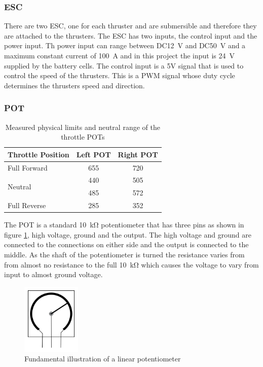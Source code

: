 		\subsubsection{ESC}
		There are two ESC, one for each thruster and are submersible and therefore they are attached to the thrusters. The ESC has two inputs, the control input and the power input. Th power input can range between DC\SI{12}{\volt} and DC\SI{50}{\volt} and a maximum constant current of \SI{100}{\ampere} and in this project the input is \SI{24}{\volt} supplied by the battery cells. The control input is a 5V signal that is used to control the speed of the thrusters. This is a PWM signal whose duty cycle determines the thrusters speed and direction. 
		\subsubsection{POT}
			\begin{table}[ht]
			\begin{center}
				\caption{Measured physical limits and neutral range of the throttle POTs}
				\label{tab:3:POT}
				\begin{tabular}{|l|c|c|}
					\hline		
					\textbf{Throttle Position} & \textbf{Left POT} & \textbf{Right POT} \\
					\hline
					Full Forward & 655 & 720\\
					\hline
					\multirow{2}{*}{Neutral} &440 &505 \\
					&485 &572  \\
					\hline
					Full Reverse & 285 & 352 \\
					\hline
				\end{tabular}
			\end{center}
		\end{table}
		The POT is a standard \SI{10}{\kilo\ohm} potentiometer that has three pins as shown in figure \ref{fig:3:POTdraw}, high voltage, ground and the output. The high voltage and ground are connected to the connections on either side and the output is connected to the middle. As the shaft of the potentiometer is turned the resistance varies from from almost no resistance to the full \SI{10}{\kilo\ohm} which causes the voltage to vary from input to almost ground voltage.  \par
		\vspace{0.4cm}
		\begin{figure}[hb]
			\begin{center}
				\includegraphics[width = 0.25\textwidth]{figures/POT.jpg}
				\caption{Fundamental illustration of a linear potentiometer}
				\label{fig:3:POTdraw}
			\end{center}
		\end{figure}
